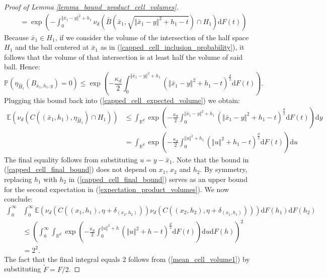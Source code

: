 \documentclass{article}
\newcommand{\RR}{\mathbb{R}}
\newcommand{\PP}{\mathbb{P}}
\newcommand{\EE}{\mathbb{E}}
\theoremstyle{plain}
\theoremstyle{remark}
\theoremstyle{definition}
\begin{document}
\begin{proof}[Proof of Lemma \ref{lemma_bound_product_cell_volumes}]
{\begin{align}
        &= \exp\left(-\int_0^{\Vert\bar{x}_1 - y \Vert^2 + h_1} \nu_d\left(\bar{B}\left(\bar{x}_1,\sqrt{\Vert\bar{x}_1 - y \Vert^2 + h_1 - t} \right)\cap H_1 \right) \mathrm{d}F(t)\right) \label{capped_cell_inclusion_probability}
    \end{align}
    }%
    Because $\bar{x}_1 \in H_1$, if we consider the volume of the intersection of the half space $H_1$ and the ball centered at $\bar{x}_1$ as in (\ref{capped_cell_inclusion_probability}), it follows that the volume of that intersection is at least half the volume of said ball. Hence:
    \[\PP\left(\eta_{\hat{H}_1}\left(B_{\bar{x}_1,h_1,y} \right) = 0 \right) \leq \exp\left(-\frac{\kappa_d}{2}\int_0^{\Vert\bar{x}_1 - y \Vert^2 + h_1}\left(\Vert \bar{x}_1  - y\Vert^2 + h_1 - t \right)^\frac{d}{2}  \mathrm{d}F(t)\right).\]
    Plugging this bound back into (\ref{capped_cell_expected_volume}) we obtain:
    \begin{align}
        \EE\left(\nu_d\left(C\left((\bar{x}_1,h_1),\eta_{\hat{H}_1}\right)\cap H_1\right)\right) &\leq \int_{\RR^d} \exp\left(-\frac{\kappa_d}{2}\int_0^{\Vert\bar{x}_1 - y \Vert^2 + h_1}\left(\Vert \bar{x}_1  - y\Vert^2 + h_1 - t \right)^\frac{d}{2}  \mathrm{d}F(t)\right)\mathrm{d}y \nonumber \\
        &= \int_{\RR^d} \exp\left(-\frac{\kappa_d}{2}\int_0^{\Vert u \Vert^2 + h_1}\left(\Vert u\Vert^2 + h_1 - t \right)^\frac{d}{2}  \mathrm{d}F(t)\right)\mathrm{d}u \label{capped_cell_final_bound}
    \end{align}
    The final equality follows from substituting $u = y - \bar{x}_1$. Note that the bound in (\ref{capped_cell_final_bound}) does not depend on $x_1$, $x_2$ and $h_2$. By symmetry, replacing $h_1$ with $h_2$ in (\ref{capped_cell_final_bound}) serves as an upper bound for the second expectation in (\ref{expectation_product_volumes}). We now conclude:
    \begin{align*}
        \int_0^\infty &\int_0^\infty \EE\left(\nu_d(C((x_1,h_1),\eta+\delta_{(x_2,h_2)}))\nu_d(C((x_2,h_2),\eta+\delta_{(x_1,h_1)})) \right)\mathrm{d}F(h_1)\mathrm{d}F(h_2)  \\
        &\leq \left(\int_0^\infty \int_{\RR^d} \exp\left(-\frac{\kappa_d}{2}\int_0^{\Vert u \Vert^2 + h}\left(\Vert u\Vert^2 + h - t \right)^\frac{d}{2}  \mathrm{d}F(t)\right)\mathrm{d}u\mathrm{d}F(h)\right)^2 \\
        &= 2^2.
    \end{align*}
    The fact that the final integral equals 2 follows from (\ref{mean_cell_volume1}) by substituting $\tilde{F} = F/2$.
\end{proof}
\end{document}
